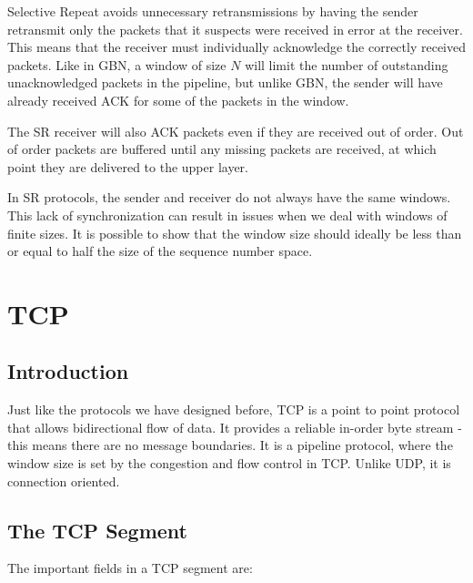 \documentclass[12pt,letterpaper]{amsbook}
\theoremstyle{definition}
\begin{document}
Selective Repeat avoids unnecessary retransmissions by having the sender retransmit only the packets that it suspects were received in error at the receiver. This means that the receiver must individually acknowledge the correctly received packets. Like in GBN, a window of size $N$ will limit the number of outstanding unacknowledged packets in the pipeline, but unlike GBN, the sender will have already received ACK for some of the packets in the window.

The SR receiver will also ACK packets even if they are received out of order. Out of order packets are buffered until any missing packets are received, at which point they are delivered to the upper layer.

In SR protocols, the sender and receiver do not always have the same windows. This lack of synchronization can result in issues when we deal with windows of finite sizes. It is possible to show that the window size should ideally be less than or equal to half the size of the sequence number space.

\section{TCP}

\subsection{Introduction}

Just like the protocols we have designed before, TCP is a point to point protocol that allows bidirectional flow of data. It provides a reliable in-order byte stream - this means there are no message boundaries. It is a pipeline protocol, where the window size is set by the congestion and flow control in TCP. Unlike UDP, it is connection oriented.

\subsection{The TCP Segment}

The important fields in a TCP segment are:
\end{document}
